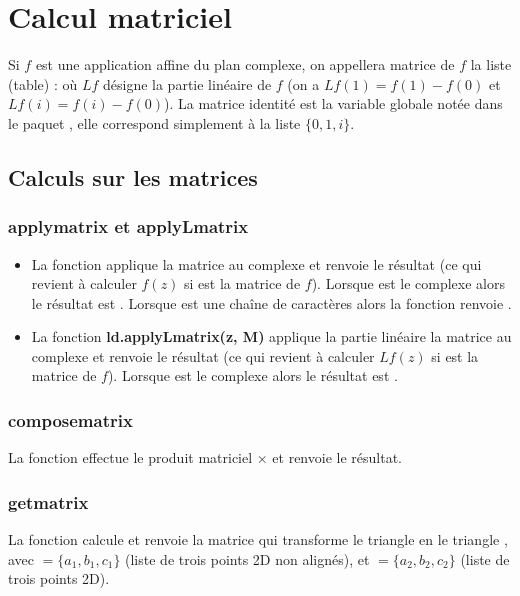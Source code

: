 \section{Calcul matriciel}

Si $f$ est une application affine du plan complexe, on appellera matrice de $f$ la liste (table) :
où $Lf$ désigne la partie linéaire de $f$ (on a $Lf(1) = f(1)-f(0)$ et $Lf(i)=f(i)-f(0)$). La matrice identité est la variable globale notée  dans le paquet \luadrawenv, elle correspond simplement à la liste $\{0,1,i\}$.

\subsection{Calculs sur les matrices}

\subsubsection{applymatrix et applyLmatrix}
\begin{itemize}
    \item La fonction  applique la matrice  au complexe  et renvoie le résultat (ce qui revient à calculer $f(z)$ si  est la matrice de $f$). Lorsque  est le complexe  alors le résultat est . Lorsque  est une chaîne de caractères alors la fonction renvoie .
    
    \item La fonction \textbf{ld.applyLmatrix(z, M)} applique la partie linéaire la matrice  au complexe  et renvoie le résultat (ce qui revient à calculer $Lf(z)$ si  est la matrice de $f$). Lorsque  est le complexe  alors le résultat est .
\end{itemize}

\subsubsection{composematrix}
La fonction  effectue le produit matriciel $\times$ et renvoie le résultat.

\subsubsection{getmatrix}
La fonction  calcule et renvoie la matrice qui transforme le triangle  en le triangle , avec $=\{a_1,b_1,c_1\}$ (liste de trois points 2D non alignés), et $=\{a_2,b_2,c_2\}$ (liste de trois points 2D).

